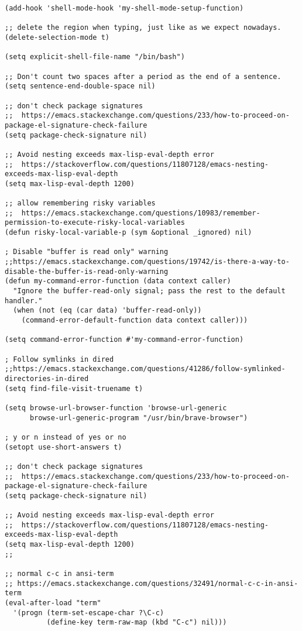 \documentclass{article}
\begin{document}
\begin{itemize}
\begin{itemize}
\begin{verbatim}
(add-hook 'shell-mode-hook 'my-shell-mode-setup-function)

;; delete the region when typing, just like as we expect nowadays.
(delete-selection-mode t)

(setq explicit-shell-file-name "/bin/bash")

;; Don't count two spaces after a period as the end of a sentence.
(setq sentence-end-double-space nil)

;; don't check package signatures
;;  https://emacs.stackexchange.com/questions/233/how-to-proceed-on-package-el-signature-check-failure
(setq package-check-signature nil)

;; Avoid nesting exceeds max-lisp-eval-depth error
;;  https://stackoverflow.com/questions/11807128/emacs-nesting-exceeds-max-lisp-eval-depth
(setq max-lisp-eval-depth 1200)

;; allow remembering risky variables
;;  https://emacs.stackexchange.com/questions/10983/remember-permission-to-execute-risky-local-variables
(defun risky-local-variable-p (sym &optional _ignored) nil)

; Disable "buffer is read only" warning
;;https://emacs.stackexchange.com/questions/19742/is-there-a-way-to-disable-the-buffer-is-read-only-warning
(defun my-command-error-function (data context caller)
  "Ignore the buffer-read-only signal; pass the rest to the default handler."
  (when (not (eq (car data) 'buffer-read-only))
    (command-error-default-function data context caller)))

(setq command-error-function #'my-command-error-function)

; Follow symlinks in dired
;;https://emacs.stackexchange.com/questions/41286/follow-symlinked-directories-in-dired
(setq find-file-visit-truename t)

(setq browse-url-browser-function 'browse-url-generic
      browse-url-generic-program "/usr/bin/brave-browser")

; y or n instead of yes or no
(setopt use-short-answers t)

;; don't check package signatures
;;  https://emacs.stackexchange.com/questions/233/how-to-proceed-on-package-el-signature-check-failure
(setq package-check-signature nil)

;; Avoid nesting exceeds max-lisp-eval-depth error
;;  https://stackoverflow.com/questions/11807128/emacs-nesting-exceeds-max-lisp-eval-depth
(setq max-lisp-eval-depth 1200)
;;

;; normal c-c in ansi-term
;; https://emacs.stackexchange.com/questions/32491/normal-c-c-in-ansi-term
(eval-after-load "term"
  '(progn (term-set-escape-char ?\C-c)
          (define-key term-raw-map (kbd "C-c") nil)))


\end{verbatim}
\end{itemize}
\end{itemize}
\end{document}
